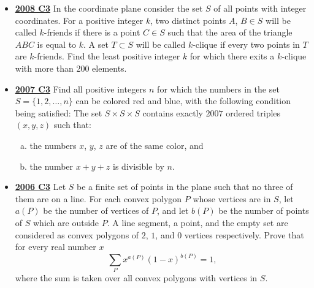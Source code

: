 \documentclass[11pt]{scrartcl}
\begin{document}
\begin{itemize}[leftmargin=*]
\item \href{https://artofproblemsolving.com/community/c6h287860p1555907}{\textbf{2008 C3}} In the coordinate plane consider the set $ S$ of all points with integer coordinates. For a positive integer $ k$, two distinct points $A$, $ B\in S$ will be called $ k$-friends if there is a point $ C\in S$ such that the area of the triangle $ ABC$ is equal to $ k$. A set $ T\subset S$ will be called $ k$-clique if every two points in $ T$ are $ k$-friends. Find the least positive integer $ k$ for which there exits a $ k$-clique with more than 200 elements. 
\item \href{https://artofproblemsolving.com/community/c6h214709p1187179}{\textbf{2007 C3}} Find all positive integers $ n$ for which the numbers in the set $ S = \{1,2, \dots,n \}$ can be colored red and blue, with the following condition being satisfied: The set $ S \times S \times S$ contains exactly $ 2007$ ordered triples $ \left(x, y, z\right)$ such that:
\begin{enumerate}[(a)]
    \item the numbers $ x$, $ y$, $ z$ are of the same color,
and
    \item the number $ x + y + z$ is divisible by $ n$. 
\end{enumerate}


\item \href{https://artofproblemsolving.com/community/c6h155694p874985}{\textbf{2006 C3}} Let $ S$ be a finite set of points in the plane such that no three of them are on a line. For each convex polygon $ P$ whose vertices are in $ S$, let $ a(P)$ be the number of vertices of $ P$, and let $ b(P)$ be the number of points of $ S$ which are outside $ P$. A line segment, a point, and the empty set are considered as convex polygons of $ 2$, $ 1$, and $ 0$ vertices respectively. Prove that for every real number $ x$\[\sum_{P}{x^{a(P)}(1 - x)^{b(P)}} = 1,\]where the sum is taken over all convex polygons with vertices in $ S$. 
\end{itemize}
\newpage
\end{document}
